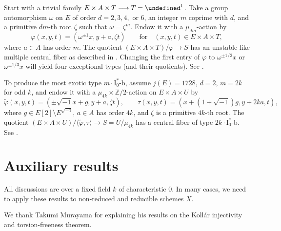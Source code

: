 \documentclass[reqno, letterpaper]{amsart}
\numberwithin{equation}{subsection}
\let\AA\undefined
\let\to\longrightarrow
\newcommand{\AA}{\mathbb{A}}
\newcommand{\ZZ}{\mathbb{Z}}
\begin{document}
	\begin{example} 
		Start with a trivial family $E \times A \times T \to T = \AA^1$. Take a group automorphism $\omega$ on $E$ of order $d = 2,3,4,$ or $6$, an integer $m$ coprime with $d$, and a primitive $dm$-th root $\zeta$ such that $\omega = \zeta^m$. Endow it with a $\mu_{dm}$-action by
		\[ \varphi (x,y,t) = (\omega^{\pm1} x, y + a, \zeta t) \qquad\mbox{for}\quad (x,y,t) \in E \times A \times T ,\]
		where $a \in A$ has order $m$. The quotient $(E \times A \times T)/\varphi \to S$ has an unstable-like multiple central fiber as described in . Changing the first entry of $\varphi$ to $\omega^{\pm1/2} x$ or $\omega^{\pm1/3}x$ will yield four exceptional types (and their quotients). See .
		
		To produce the most exotic type $m \cdot \mathrm I_0^*$-b, assume $j(E) = 1728$, $d = 2$, $m = 2k$ for odd $k$, and endow it with a $\mu_{4k} \times \ZZ/2$-action on $E \times A \times U$ by
		\[ \tilde \varphi(x,y,t) = (\pm \sqrt{-1} x + g, y + a, \zeta t) ,\qquad \tau(x,y,t) = (x + (1 + \sqrt{-1}) g, y + 2ka, t) ,\]
		where $g \in E[2] \setminus E^{\sqrt{-1}}$, $a \in A$ has order $4k$, and $\zeta$ is a primitive $4k$-th root. The quotient $(E \times A \times U)/\langle \tilde \varphi, \tau \rangle \to S = U / \mu_{4k}$ has a central fiber of type $2k \cdot \mathrm I_0^*$-b. See .
	\end{example}
	
	
	
	
	
\appendix
\section{Auxiliary results} \label{sec:appendix}
	All discussions are over a fixed field $k$ of characteristic $0$. In many cases, we need to apply these results to non-reduced and reducible schemes $X$.
	
	\medskip
	
	We thank Takumi Murayama for explaining his results on the Koll\'ar injectivity and torsion-freeness theorem.
	
\end{document}
